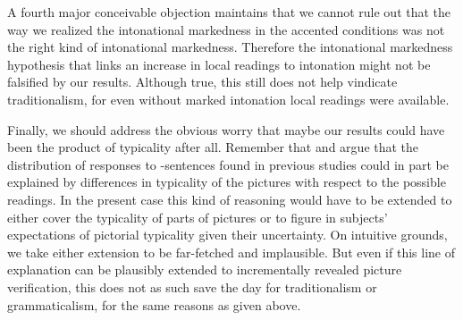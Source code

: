 \documentclass[fleqn,reqno,10pt,draft]{article}
\newcommand{\as}{\acro{as}}
\begin{document}
A fourth major conceivable objection maintains that we cannot rule out
that the way we realized the intonational markedness in the accented
conditions was not the right kind of intonational
markedness. Therefore the intonational markedness hypothesis that
links an increase in local readings to intonation might not be
falsified by our results. Although true, this still does not help
vindicate traditionalism, for even without marked intonation local
readings were available.

Finally, we should address the obvious worry that maybe our results
could have been the product of typicality after all. Remember that
\citet{Tielvan-Tiel2012:Embedded-Scalar} and
\citet{GeurtsTielvan-Tiel2013:Scalar-expressi} argue that the
distribution of responses to \as-sentences found in previous studies
could in part be explained by differences in typicality of the
pictures with respect to the possible readings. In the present case
this kind of reasoning would have to be extended to either cover the
typicality of parts of pictures or to figure in subjects' expectations
of pictorial typicality given their uncertainty. On intuitive grounds,
we take either extension to be far-fetched and implausible. But even
if this line of explanation can be plausibly extended to incrementally
revealed picture verification, this does not as such save the day for
traditionalism or grammaticalism, for the same reasons as given above.
\end{document}

